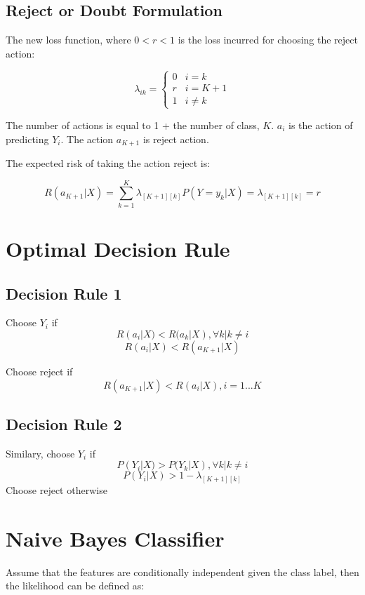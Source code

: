 \begin{multicols}{2}
\subsection{Reject or Doubt Formulation}
\noindent The new loss function, where $0 < r < 1$ is the loss incurred for choosing the reject action:

$$
\lambda_{ik} = 
\begin{cases}
0 & i=k\\
r & i = K + 1 \\
1 & i \ne k
\end{cases}
$$

\noindent The number of actions is equal to 1 + the number of class, $K$. $a_{i}$ is the action of predicting $Y_{i}$. The action $a_{K+1}$ is reject action. 

\noindent The expected risk of taking the action reject is:

$$R(a_{K+1}|X) = \sum_{k=1}^K \lambda_{[K+1][k]} P(Y=y_k|X) = \lambda_{[K+1][k]} = r$$

\section{Optimal Decision Rule}

\subsection{Decision Rule 1}

\noindent Choose $Y_{i}$ if 
$$R(a_{i}|X) < R(a_{k}|X), \forall k|k \ne i$$
$$R(a_{i}|X) < R(a_{K+1}|X)$$

\noindent Choose reject if
$$R(a_{K+1}|X) < R(a_{i}|X), i=1...K$$

\subsection{Decision Rule 2}

\noindent Similary, choose $Y_{i}$ if 
$$P(Y_{i}|X) > P(Y_{k}|X), \forall k|k \ne i$$
$$P(Y_{i}|X) > 1 - \lambda_{[K+1][k]}$$
\noindent Choose reject otherwise

\section{Naive Bayes Classifier}

\noindent Assume that the features are conditionally independent given the class label, then the likelihood can be defined as:


\end{multicols}
